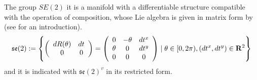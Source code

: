 The group $SE(2)$ it is a manifold with a differentiable structure compatible with the operation of composition, whose Lie algebra is given in matrix form by (see \cite{hall2015lie, gallier2011geometric} for an introduction).
\begin{align*}
\mathfrak{se}(2) := 
\left \{
\left (
\begin{array} {c c }
dR(\theta) & dt \\
0 & 0
\end{array}
\right )
=
\left (
\begin{array} {c c c }
0 & -\theta &  dt^{x} \\
\theta & 0 & dt^{y} \\
0& 0 & 0
\end{array}
\right )
\mid
\theta \in  [0, 2\pi), (dt^x, dt^y) \in\mathbf{R}^2
\right \}
\end{align*}
and it is indicated with $\mathfrak{se}(2)^{v}$ in its restricted form.

